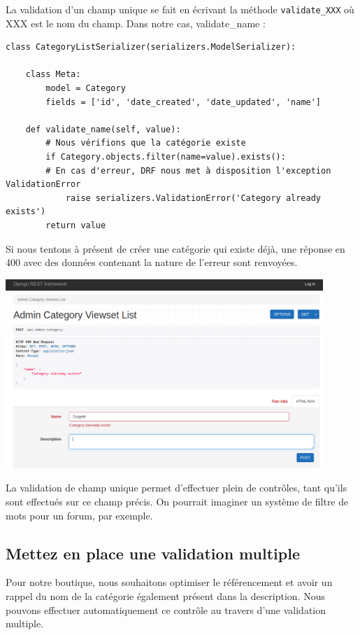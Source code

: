 \documentclass[a4paper]{article}
\begin{document}
La {\color{monOrange}validation d’un champ} unique se fait en écrivant la méthode {\tt validate\_XXX}  où XXX  est le nom du champ. Dans notre cas, {\color{monOrange}validate\_name}  :
\begin{verbatim}
class CategoryListSerializer(serializers.ModelSerializer):
 
    class Meta:
        model = Category
        fields = ['id', 'date_created', 'date_updated', 'name']
 
    def validate_name(self, value):
        # Nous vérifions que la catégorie existe
        if Category.objects.filter(name=value).exists():
        # En cas d'erreur, DRF nous met à disposition l'exception ValidationError
            raise serializers.ValidationError('Category already exists')
        return value
\end{verbatim}
Si nous tentons à présent de créer une catégorie qui existe déjà, une réponse en 400 avec des données contenant la nature de l’erreur sont renvoyées.
\begin{center}
\includegraphics[width=12cm]{images/image21.png}
\end{center}
La validation de champ unique permet d’effectuer plein de {\color{monOrange}contrôles}, tant qu’ils sont effectués sur ce champ précis. On pourrait imaginer un système de filtre de mots pour un forum, par exemple.

\subsection{Mettez en place une validation multiple}
Pour notre boutique, nous souhaitons optimiser le référencement et avoir un rappel du nom de la catégorie également présent dans la description. Nous pouvons effectuer automatiquement ce contrôle au travers d’une validation multiple.
\end{document}
